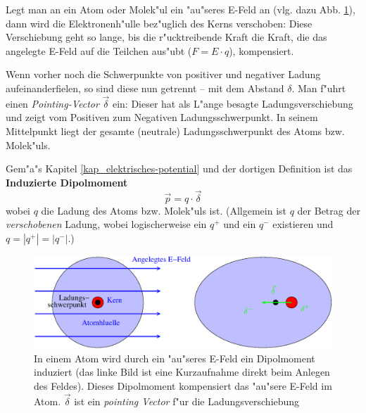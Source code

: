 Legt man an ein Atom oder Molek"ul ein "au"seres E-Feld an (vlg. dazu
Abb. \ref{abb_induz_dipolmoment}), dann wird die Elektronenh"ulle
bez"uglich des Kerns verschoben: Diese Verschiebung geht so lange, bis
die r"ucktreibende Kraft die Kraft, die das angelegte E-Feld auf die
Teilchen aus"ubt ($F = E \cdot q$), kompensiert.

Wenn vorher noch die Schwerpunkte von positiver und negativer Ladung
aufeinanderfielen, so sind diese nun getrennt -- mit dem Abstand
$\delta$. Man f"uhrt einen \emph{Pointing-Vector} $\vec \delta$ ein:
Dieser hat als L"ange besagte Ladungsverschiebung und zeigt vom
Positiven zum Negativen Ladungsschwerpunkt. In seinem Mittelpunkt
liegt der gesamte (neutrale) Ladungsschwerpunkt des Atoms
bzw. Molek"uls.

Gem"a"s Kapitel \ref{kap_elektrisches-potential} und der dortigen
Definition ist das \textbf{Induzierte
  Dipolmoment}
\begin{equation}
   \label{eqn_differenz-c29}
   \vec p = q \cdot \vec \delta
\end{equation}
wobei $q$ die Ladung des Atoms bzw. Molek"uls ist. (Allgemein ist $q$ der
Betrag der \emph{verschobenen} Ladung, wobei logischerweise ein $q^+$
und ein $q^-$ existieren und $q = |q^+| = |q^-|$.)

\begin{figure}
   \centering
   \includegraphics[width=\textwidth]{bilder/induz_dipolmomen}
   \caption[Dipolmoment]{In einem Atom wird durch ein "au"seres E-Feld
     ein Dipolmoment induziert (das linke Bild ist eine Kurzaufnahme
     direkt beim Anlegen des Feldes). Dieses Dipolmoment kompensiert
     das "au"sere E-Feld im Atom. $\vec \delta$ ist ein \emph{pointing
       Vector} f"ur die Ladungsverschiebung}
   \label{abb_induz_dipolmoment}
\end{figure}


